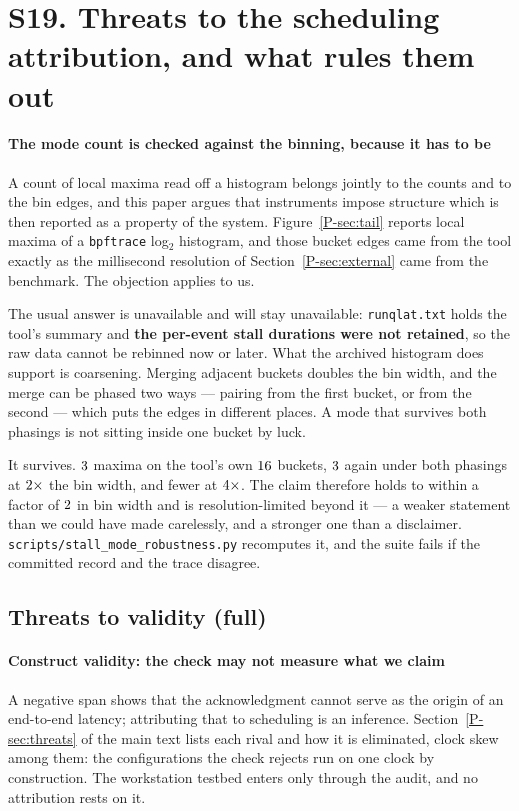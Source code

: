 \documentclass[10pt,journal,onecolumn]{IEEEtran}
\newcommand{\mainThreats}{\ref{P-sec:threats}}        %
\newcommand{\mainModeB}{\ref{P-sec:external}}              %
\newcommand{\mainSpectrum}{\ref{P-sec:tail}}        %
\begin{document}
\section{S19. Threats to the scheduling attribution, and what rules them out}

\paragraph{The mode count is checked against the binning, because it has to be} A count
of local maxima read off a histogram belongs jointly to the counts and to the bin edges,
and this paper argues that instruments impose structure which is then reported as a
property of the system. Figure~\mainSpectrum{} reports local maxima of a
\texttt{bpftrace} log$_2$ histogram, and those bucket edges came from the tool exactly as
the millisecond resolution of Section~\mainModeB{} came from the benchmark. The objection
applies to us.

The usual answer is unavailable and will stay unavailable: \texttt{runqlat.txt} holds the
tool's summary and \textbf{the per-event stall durations were not retained}, so the raw
data cannot be rebinned now or later. What the archived histogram does support is
coarsening. Merging adjacent buckets doubles the bin width, and the merge can be phased
two ways --- pairing from the first bucket, or from the second --- which puts the edges in
different places. A mode that survives both phasings is not sitting inside one bucket by
luck.

It survives. $3$ maxima on the tool's own $16$ buckets,
$3$ again under both phasings at $2\times$ the bin width,
and fewer at $4\times$. The claim therefore holds to within a factor of
$2$ in bin width and is resolution-limited beyond it --- a weaker
statement than we could have made carelessly, and a stronger one than a disclaimer.
\texttt{scripts/stall\_mode\_robustness.py} recomputes it, and the suite fails if the
committed record and the trace disagree.

\subsection*{Threats to validity (full)}

\paragraph{Construct validity: the check may not measure what we claim} A negative span shows
that the acknowledgment cannot serve as the origin of an end-to-end latency; attributing that to
scheduling is an inference. Section~\mainThreats{} of the main text lists each rival and how it
is eliminated, clock skew among them: the configurations the check rejects run on one clock by
construction. The workstation testbed enters only through the audit, and no attribution rests
on it.
\end{document}
